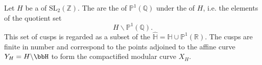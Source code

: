 \begin{definition} \label{definition:cusps_of_a_congruence_subgroup_of_SL_2_Z}
Let $H$ be a  of $\mathrm{SL}_2(\mathbb{Z})$. The  are the  of $\mathbb{P}^1(\mathbb{Q})$ under the  of $H$, i.e. the elements of the quotient set
$$H \backslash \mathbb{P}^1(\mathbb{Q}).$$
This set of cusps is regarded as a subset of the  $\hat{\mathbb{H}} = \mathbb{H} \cup \mathbb{P}^1(\mathbb{R})$.
The cusps are finite in number and correspond to the points adjoined to the affine curve $Y_H = H \backslash \bbH$ to form the compactified modular curve $X_H$.
\end{definition}